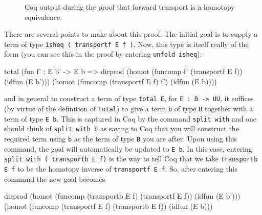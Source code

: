 \begin{figure}[H]
  \caption{Coq output during the proof that forward transport is a
    homotopy equivalence.}
  \label{figure:isheqtransportf}
\end{figure}
There are several points to make about this proof.  The initial goal is
to supply a term of type \verb|isheq ( transportf E f )|.  Now,
this type is itself really of the form (you can see this in the proof
by entering \verb|unfold isheq|):
\begin{center}
  \begin{coqcode}
total (fun f' : E b' -> E b => dirprod (homot (funcomp f' (transportf
E f)) (idfun (E b'))) (homot (funcomp (transportf E f) f') (idfun (E b))))
  \end{coqcode}
\end{center}
and in general to construct a term of type \verb|total E|, for 
\verb|E : B -> UU|, it suffices (by virtue of the definition of 
\verb|total|) to give a term \verb|b| of type
\verb|B| together with a term of type \verb|E b|.  This is
captured in Coq by the command \verb|split with| and one should
think of \verb|split with b| as saying to Coq that you will
construct the required term using \verb|b| as the term of type
\verb|B| you are after.  Upon using this command, the goal will
automatically be updated to \verb|E b|.  In this case, 
entering \verb|split with ( transportb E f)| is the way to tell
Coq that we take \verb|transportb E f| to be the homotopy inverse
of \verb|transportf E f|.  So, after entering this
command the new goal becomes
\begin{center}
  \begin{coqcode}
dirprod 
 (homot (funcomp (transportb E f) (transportf E f)) (idfun (E b')))
 (homot (funcomp (transportf E f) (transportb E f)) (idfun (E b)))
  \end{coqcode}
\end{center}
